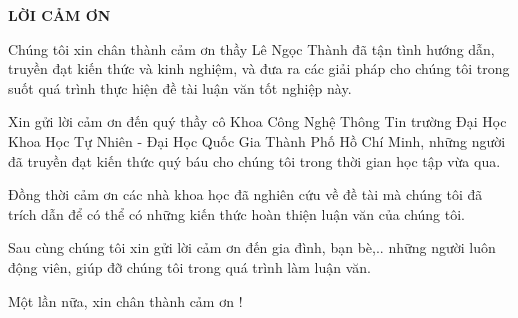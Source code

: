 \vspace{2cm}

%
%
%	
%	
%	
%	
%	



{}
\label{chap:thanks}

{\MakeUppercase\centering\Large\bfseries LỜI CẢM ƠN}

\vspace{2cm}


Chúng tôi xin chân thành cảm ơn thầy Lê Ngọc Thành đã tận tình hướng dẫn, truyền đạt kiến thức và kinh nghiệm, và đưa ra các giải pháp cho chúng tôi trong suốt quá trình thực hiện đề tài luận văn tốt nghiệp này.

Xin gửi lời cảm ơn đến quý thầy cô Khoa Công Nghệ Thông Tin trường Đại Học Khoa Học Tự Nhiên - Đại Học Quốc Gia Thành Phố Hồ Chí Minh, những người đã truyền đạt kiến thức quý báu cho chúng tôi trong thời gian học tập vừa qua.

Đồng thời cảm ơn các nhà khoa học đã nghiên cứu về đề tài mà chúng tôi đã trích dẫn để có thể có những kiến thức hoàn thiện luận văn của chúng tôi.

Sau cùng chúng tôi xin gửi lời cảm ơn đến gia đình, bạn bè,.. những người luôn động viên, giúp đỡ chúng tôi trong quá trình làm luận văn. 

Một lần nữa, xin chân thành cảm ơn !

\pagebreak
